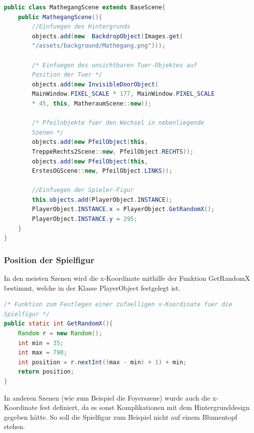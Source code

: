 \begin{lstlisting}[caption=Mathegangszene, label=lst:mahtegangszene, captionpos=m, language=Java]
public class MathegangScene extends BaseScene{
	public MathegangScene(){
		//Einfuegen des Hintergrunds
		objects.add(new  BackdropObject(Images.get(
		"/assets/background/Mathegang.png")));
		
		/* Einfuegen des unsichtbaren Tuer-Objektes auf 
		Position der Tuer */
		objects.add(new InvisibleDoorObject(
		MainWindow.PIXEL_SCALE * 177, MainWindow.PIXEL_SCALE 
		* 45, this, MatheraumScene::new));
		
		/* Pfeilobjekte fuer den Wechsel in nebenliegende 
		Szenen */
		objects.add(new PfeilObject(this, 
		TreppeRechts2Scene::new, PfeilObject.RECHTS));
		objects.add(new PfeilObject(this, 
		ErstesOGScene::new, PfeilObject.LINKS));
		
		//Einfuegen der Spieler-Figur
		this.objects.add(PlayerObject.INSTANCE);
		PlayerObject.INSTANCE.x = PlayerObject.GetRandomX();
		PlayerObject.INSTANCE.y = 295;
	}
}
\end{lstlisting}

\subsubsection{Position der Spielfigur}
In den meisten Szenen wird die x-Koordinate mithilfe der Funktion GetRandomX bestimmt, welche in der Klasse PlayerObject festgelegt ist. 

\begin{lstlisting}[caption=GetRandonX-Methode, label=lst:getrandomx, captionpos=g, language=Java]
/* Funktion zum Festlegen einer zufaelligen x-Koordinate fuer die 
Spielfigur */
public static int GetRandomX(){
	Random r = new Random();
	int min = 35;
	int max = 790;
	int position = r.nextInt((max - min) + 1) + min;
	return position;
}
\end{lstlisting}

In anderen Szenen (wie zum Beispiel die Foyerszene) wurde auch die x-Koordinate fest definiert, da es sonst Komplikationen mit dem Hintergrunddesign gegeben hätte. So soll die Spielfigur zum Beispiel nicht auf einem Blumentopf stehen.
